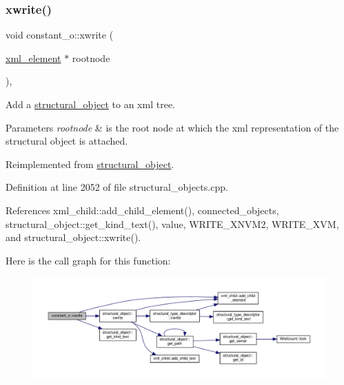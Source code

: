 \subsubsection{\texorpdfstring{xwrite()}{xwrite()}}
{\footnotesize\ttfamily void constant\+\_\+o\+::xwrite (\begin{DoxyParamCaption}\item[{\hyperlink{classxml__element}{xml\+\_\+element} $\ast$}]{rootnode }\end{DoxyParamCaption})\hspace{0.3cm}{\ttfamily [override]}, {\ttfamily [virtual]}}



Add a \hyperlink{classstructural__object}{structural\+\_\+object} to an xml tree. 


\begin{DoxyParams}{Parameters}
{\em rootnode} & is the root node at which the xml representation of the structural object is attached. \\
\hline
\end{DoxyParams}


Reimplemented from \hyperlink{classstructural__object_a7b0b509094451578b2dc10a9b716b16e}{structural\+\_\+object}.



Definition at line 2052 of file structural\+\_\+objects.\+cpp.



References xml\+\_\+child\+::add\+\_\+child\+\_\+element(), connected\+\_\+objects, structural\+\_\+object\+::get\+\_\+kind\+\_\+text(), value, W\+R\+I\+T\+E\+\_\+\+X\+N\+V\+M2, W\+R\+I\+T\+E\+\_\+\+X\+VM, and structural\+\_\+object\+::xwrite().

Here is the call graph for this function\+:
\nopagebreak
\begin{figure}[H]
\begin{center}
\leavevmode
\includegraphics[width=350pt]{d4/d65/classconstant__o_a6d7224d9422459b095468da97fb8a4f0_cgraph}
\end{center}
\end{figure}


